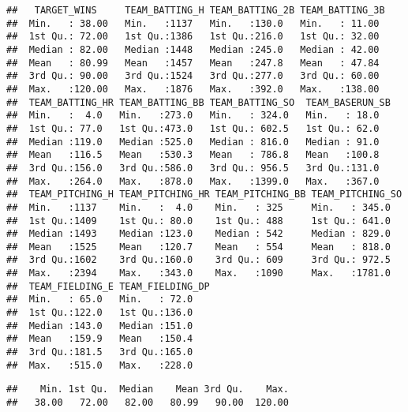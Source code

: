 \documentclass[
]{article}
\newenvironment{Shaded}{\begin{snugshade}}{\end{snugshade}}
\newcommand{\KeywordTok}[1]{\textcolor[rgb]{0.13,0.29,0.53}{\textbf{#1}}}
\newcommand{\NormalTok}[1]{#1}
\newcommand{\OperatorTok}[1]{\textcolor[rgb]{0.81,0.36,0.00}{\textbf{#1}}}
\begin{document}
\begin{verbatim}
##   TARGET_WINS     TEAM_BATTING_H TEAM_BATTING_2B TEAM_BATTING_3B 
##  Min.   : 38.00   Min.   :1137   Min.   :130.0   Min.   : 11.00  
##  1st Qu.: 72.00   1st Qu.:1386   1st Qu.:216.0   1st Qu.: 32.00  
##  Median : 82.00   Median :1448   Median :245.0   Median : 42.00  
##  Mean   : 80.99   Mean   :1457   Mean   :247.8   Mean   : 47.84  
##  3rd Qu.: 90.00   3rd Qu.:1524   3rd Qu.:277.0   3rd Qu.: 60.00  
##  Max.   :120.00   Max.   :1876   Max.   :392.0   Max.   :138.00  
##  TEAM_BATTING_HR TEAM_BATTING_BB TEAM_BATTING_SO  TEAM_BASERUN_SB
##  Min.   :  4.0   Min.   :273.0   Min.   : 324.0   Min.   : 18.0  
##  1st Qu.: 77.0   1st Qu.:473.0   1st Qu.: 602.5   1st Qu.: 62.0  
##  Median :119.0   Median :525.0   Median : 816.0   Median : 91.0  
##  Mean   :116.5   Mean   :530.3   Mean   : 786.8   Mean   :100.8  
##  3rd Qu.:156.0   3rd Qu.:586.0   3rd Qu.: 956.5   3rd Qu.:131.0  
##  Max.   :264.0   Max.   :878.0   Max.   :1399.0   Max.   :367.0  
##  TEAM_PITCHING_H TEAM_PITCHING_HR TEAM_PITCHING_BB TEAM_PITCHING_SO
##  Min.   :1137    Min.   :  4.0    Min.   : 325     Min.   : 345.0  
##  1st Qu.:1409    1st Qu.: 80.0    1st Qu.: 488     1st Qu.: 641.0  
##  Median :1493    Median :123.0    Median : 542     Median : 829.0  
##  Mean   :1525    Mean   :120.7    Mean   : 554     Mean   : 818.0  
##  3rd Qu.:1602    3rd Qu.:160.0    3rd Qu.: 609     3rd Qu.: 972.5  
##  Max.   :2394    Max.   :343.0    Max.   :1090     Max.   :1781.0  
##  TEAM_FIELDING_E TEAM_FIELDING_DP
##  Min.   : 65.0   Min.   : 72.0   
##  1st Qu.:122.0   1st Qu.:136.0   
##  Median :143.0   Median :151.0   
##  Mean   :159.9   Mean   :150.4   
##  3rd Qu.:181.5   3rd Qu.:165.0   
##  Max.   :515.0   Max.   :228.0
\end{verbatim}

\begin{Shaded}
\end{Shaded}

\begin{verbatim}
##    Min. 1st Qu.  Median    Mean 3rd Qu.    Max. 
##   38.00   72.00   82.00   80.99   90.00  120.00
\end{verbatim}

\begin{Shaded}
\end{Shaded}
\end{document}
